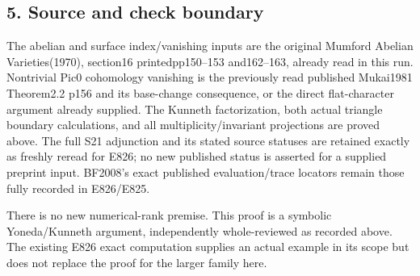 \subsection{5. Source and check boundary}\label{SF-E827:source-and-check-boundary}

The abelian and surface index/vanishing inputs are the original Mumford
Abelian Varieties(1970), section16 printedpp150--153 and162--163, already
read in this run. Nontrivial Pic0 cohomology vanishing is the previously
read published Mukai1981 Theorem2.2 p156 and its base-change consequence, or
the direct flat-character argument already supplied. The Kunneth
factorization, both actual triangle boundary calculations, and all
multiplicity/invariant projections are proved above. The full S21 adjunction
and its stated source statuses are retained exactly as freshly reread for
E826; no new published status is asserted for a supplied preprint input.
BF2008's exact published evaluation/trace locators remain those fully
recorded in E826/E825.

There is no new numerical-rank premise. This proof is a symbolic
Yoneda/Kunneth argument, independently whole-reviewed as recorded above. The
existing E826 exact computation supplies an actual example in its scope but
does not replace the proof for the larger family here.
